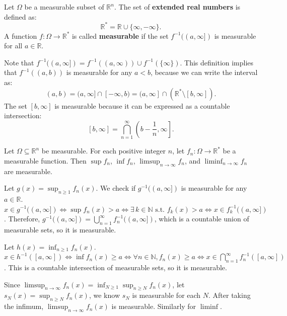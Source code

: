 \begin{definition}
    Let $\Omega$ be a measurable subset of $\mathbb{R}^n$. The set of \textbf{extended real numbers} is defined as:
    \[ \mathbb{R}^* = \mathbb{R} \cup \{ \infty, -\infty \}. \]
    A function $f: \Omega \to \mathbb{R}^*$ is called \textbf{measurable} if the set $f^{-1}((a, \infty])$ is measurable for all $a \in \mathbb{R}$.
\end{definition}

\begin{remark}
    Note that $f^{-1}((a, \infty]) = f^{-1}((a, \infty)) \cup f^{-1}(\{\infty\})$. This definition implies that $f^{-1}((a, b))$ is measurable for any $a < b$, because we can write the interval as:
    \[ (a, b) = (a, \infty] \cap [-\infty, b) = (a, \infty] \cap \left( \mathbb{R}^* \setminus [b, \infty] \right). \]
    The set $[b, \infty]$ is measurable because it can be expressed as a countable intersection:
    \[ [b, \infty] = \displaystyle\bigcap_{n=1}^\infty \left( b - \frac{1}{n}, \infty \right]. \]
\end{remark}


\begin{theorem}
    Let $\Omega \subseteq \mathbb{R}^n$ be measurable. For each positive integer $n$, let $f_n: \Omega \rightarrow \mathbb{R}^*$ be a measurable function. Then $\sup f_n$, $\inf f_n$, $\limsup_{n\to\infty} f_n$, and $\liminf_{n\to\infty} f_n$ are measurable.
\end{theorem}

\begin{pfbox}
    Let $g(x) = \sup_{n \ge 1} f_n(x)$. We check if $g^{-1}((a, \infty])$ is measurable for any $a \in \mathbb{R}$. 
    $x \in g^{-1}((a, \infty]) \Leftrightarrow \sup f_n(x) > a \Leftrightarrow \exists\, k \in \mathbb{N} \text{ s.t. } f_k(x) > a \Leftrightarrow x \in f_k^{-1}((a, \infty])$. 
    Therefore, $g^{-1}((a, \infty]) = \displaystyle\bigcup_{n=1}^\infty f_n^{-1}((a, \infty])$, which is a countable union of measurable sets, so it is measurable.
    
    Let $h(x) = \inf_{n \ge 1} f_n(x)$. $x \in h^{-1}([a, \infty]) \Leftrightarrow \inf f_n(x) \ge a \Leftrightarrow \forall n \in \mathbb{N}, f_n(x) \ge a \Leftrightarrow x \in \displaystyle\bigcap_{n=1}^\infty f_n^{-1}([a, \infty])$. This is a countable intersection of measurable sets, so it is measurable.
    
    Since $\displaystyle\limsup_{n\to\infty} f_n(x) = \displaystyle\inf_{N \ge 1} \sup_{n \ge N} f_n(x)$, let $s_N(x)=\displaystyle\sup_{n\ge N}f_n(x)$, we know $s_N$ is measurable for each $N$. After taking the infimum, $\displaystyle\limsup_{n\to\infty} f_n(x)$ is measurable. Similarly for $\liminf$.
\end{pfbox}

